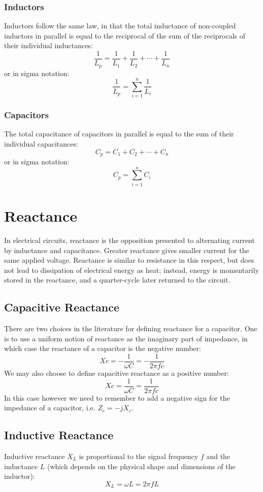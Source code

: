 \documentclass[12pt,a4paper,oneside]{article}
\begin{document}
\subsubsection{Inductors}
Inductors follow the same law, in that the total inductance of non-coupled inductors in parallel is equal to the reciprocal of the sum of the reciprocals of their individual inductances:
\[
	\frac{1}{L_p} = \frac{1}{L_1} + \frac{1}{L_2} + \cdots + \frac{1}{L_n}
\]
or in sigma notation:
\[
	\frac{1}{L_p} = \sum_{i = 1}^n \frac{1}{L_i}
\]
\subsubsection{Capacitors}
The total capacitance of capacitors in parallel is equal to the sum of their individual capacitances:
\[
	C_p = C_1 + C_2 + \cdots + C_n
\]
or in sigma notation:
\[
	C_p = \sum_{i = 1}^n C_i
\]
\section{Reactance}
In electrical circuits, reactance is the opposition presented to alternating current by inductance and capacitance. Greater reactance gives smaller current for the same applied voltage. Reactance is similar to resistance in this respect, but does not lead to dissipation of electrical energy as heat; instead, energy is momentarily stored in the reactance, and a quarter-cycle later returned to the circuit.
\subsection{Capacitive Reactance}
There are two choices in the literature for defining reactance for a capacitor. One is to use a uniform notion of reactance as the imaginary part of impedance, in which case the reactance of a capacitor is the negative number:
\[
	Xc = -\frac{1}{\omega C} = -\frac{1}{2 \pi f c}
\]
We may also choose to define capacitive reactance as a positive number:
\[
	Xc = \frac{1}{\omega C} = \frac{1}{2 \pi f c}
\]
In this case however we need to remember to add a negative sign for the impedance of a capacitor, i.e. \(Z_c = -jX_c\).
\subsection{Inductive Reactance}
Inductive reactance \(X_{L}\) is proportional to the signal frequency \(f\) and the inductance \(L\) (which depends on the physical shape and dimensions of the inductor):
\[
	X_L = \omega L = 2 \pi f L
\]
\end{document}
